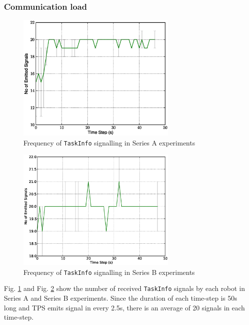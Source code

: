\documentclass[smallcondensed]{svjour3}
\begin{document}
\subsubsection{Communication load}
\begin{figure}
\centering
\includegraphics[width=0.7\textwidth]
{./8Robot-SignalingFreqStat.eps}
\caption{\small Frequency of \texttt{TaskInfo} signalling in Series A experiments}
\label{fig:signal-frequency-stat-SA} 
\end{figure}
\begin{figure}
\centering
\includegraphics[width=0.7\textwidth]{./Global-SignalingFreqStat.eps}
\caption{\small Frequency of \texttt{TaskInfo} signalling in Series B experiments}
\label{fig:signal-frequency-stat-SB} 
\end{figure}
Fig. \ref{fig:signal-frequency-stat-SA}  and Fig. \ref{fig:signal-frequency-stat-SB}  show the number of received \texttt{TaskInfo} signals by each robot in Series A and Series B experiments. Since the duration of each time-step is 50s long and TPS emits signal in every 2.5s, there is an average of 20 signals in each time-step.
\end{document}
